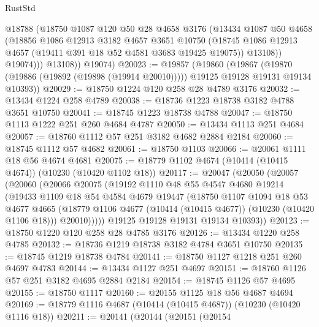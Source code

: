 \begin{lexlean}{RustStd}
\begin{coremodule}
              @18788
              (@18750
                @1087
                @120
                @50
                @28
                @4658
                @3176
                (@13434
                  @1087
                  @50
                  @4658
                  (@18856
                    @1086
                    @12913
                    @3182
                    @4657
                    @3651
                    @10750
                    (@18745 @1086 @12913 @4657 (@19411 @391 @18 @52 @4581 @3683 @19425 @19075))
                    @13108))
                @19074)))
          @13108))
      @19074)
@20023 := @19857
    (@19860
      (@19867
        (@19870 (@19886 (@19892 (@19898 (@19914 @20010)))))
        @19125
        @19128
        @19131
        @19134
        @10393))
@20029 := @18750 @1224 @120 @258 @28 @4789 @3176
@20032 := @13434 @1224 @258 @4789
@20038 := @18736 @1223 @18738 @3182 @4788 @3651 @10750
@20041 := @18745 @1223 @18738 @4788
@20047 := @18750 @1113 @1222 @251 @260 @4684 @4787
@20050 := @13434 @1113 @251 @4684
@20057 := @18760 @1112 @57 @251 @3182 @4682 @2884 @2184
@20060 := @18745 @1112 @57 @4682
@20061 := @18750 @1103
@20066 := @20061 @1111 @18 @56 @4674 @4681
@20075 := @18779 @1102 @4674 (@10414 (@10415 @4674)) (@10230 (@10420 @1102 @18))
@20117 := @20047
    (@20050
      (@20057
        (@20060
          (@20066
            @20075
            (@19192
              @1110
              @48
              @55
              @4547
              @4680
              @19214
              (@19433
                @1109
                @18
                @54
                @4584
                @4679
                @19447
                (@18750
                  @1107
                  @1094
                  @18
                  @53
                  @4677
                  @4665
                  (@18779 @1106 @4677 (@10414 (@10415 @4677)) (@10230 (@10420 @1106 @18)))
                  @20010)))))
        @19125
        @19128
        @19131
        @19134
        @10393))
@20123 := @18750 @1220 @120 @258 @28 @4785 @3176
@20126 := @13434 @1220 @258 @4785
@20132 := @18736 @1219 @18738 @3182 @4784 @3651 @10750
@20135 := @18745 @1219 @18738 @4784
@20141 := @18750 @1127 @1218 @251 @260 @4697 @4783
@20144 := @13434 @1127 @251 @4697
@20151 := @18760 @1126 @57 @251 @3182 @4695 @2884 @2184
@20154 := @18745 @1126 @57 @4695
@20155 := @18750 @1117
@20160 := @20155 @1125 @18 @56 @4687 @4694
@20169 := @18779 @1116 @4687 (@10414 (@10415 @4687)) (@10230 (@10420 @1116 @18))
@20211 := @20141
    (@20144
      (@20151
        (@20154

\end{coremodule}
\end{lexlean}
